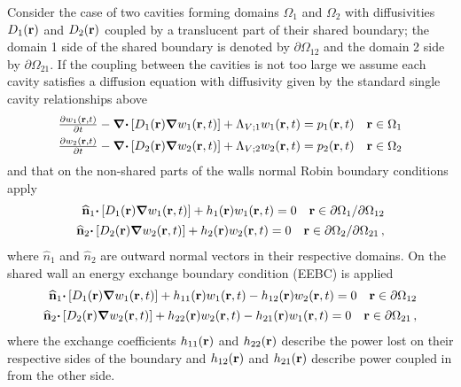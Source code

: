 \documentclass[a4paper]{article}
\numberwithin{equation}{section}
\begin{document}
Consider the case of two cavities forming domains $\Omega_1$ and $\Omega_2$ with
diffusivities $D_1(\boldsymbol{\mathrm{r}})$ and $D_2(\boldsymbol{\mathrm{r}})$ coupled by a translucent part of their 
shared boundary; the domain 1 side of the shared boundary is denoted by 
${\partial}\Omega_{12}$ and the domain 2 side by ${\partial}\Omega_{21}$.
If the coupling between the cavities is not too large we assume each cavity 
satisfies a diffusion equation with diffusivity given by the standard single 
cavity relationships above
\begin{align}
\begin{matrix}
\frac{{\partial}w_1(\boldsymbol{\mathrm{r}},t)}{{\partial}t}-{\boldsymbol{\mathrm{\nabla}}}{\boldsymbol{\mathrm{\cdot}}}\left[D_1(\boldsymbol{\mathrm{r}}){\boldsymbol{\mathrm{\nabla}}}w_1(\boldsymbol{\mathrm{r}},t)\right]+\Lambda_{V;1}w_1(\boldsymbol{\mathrm{r}},t) = p_1(\boldsymbol{\mathrm{r}},t) &\boldsymbol{\mathrm{r}}\in\Omega_1
\end{matrix} \\
\begin{matrix}
\frac{{\partial}w_2(\boldsymbol{\mathrm{r}},t)}{{\partial}t}-{\boldsymbol{\mathrm{\nabla}}}{\boldsymbol{\mathrm{\cdot}}}\left[D_2(\boldsymbol{\mathrm{r}}){\boldsymbol{\mathrm{\nabla}}}w_2(\boldsymbol{\mathrm{r}},t)\right]+\Lambda_{V;2}w_2(\boldsymbol{\mathrm{r}},t) = p_2(\boldsymbol{\mathrm{r}},t) &\boldsymbol{\mathrm{r}}\in\Omega_2
\end{matrix}
\end{align}
and that on the non-shared parts of the walls normal Robin boundary conditions
apply
\begin{align}
\begin{matrix}
\widehat{\boldsymbol{\mathrm{n}}}_1{\boldsymbol{\mathrm{\cdot}}}\left[D_1(\boldsymbol{\mathrm{r}}){\boldsymbol{\mathrm{\nabla}}}w_1(\boldsymbol{\mathrm{r}},t)\right]+h_1(\boldsymbol{\mathrm{r}}) w_1(\boldsymbol{\mathrm{r}},t) = 0 &\boldsymbol{\mathrm{r}}\in\partial\Omega_1/\partial\Omega_{12}
\end{matrix}\\
\begin{matrix}
\widehat{\boldsymbol{\mathrm{n}}}_2{\boldsymbol{\mathrm{\cdot}}}\left[D_2(\boldsymbol{\mathrm{r}}){\boldsymbol{\mathrm{\nabla}}}w_2(\boldsymbol{\mathrm{r}},t)\right]+h_2(\boldsymbol{\mathrm{r}}) w_2(\boldsymbol{\mathrm{r}},t) = 0 &\boldsymbol{\mathrm{r}}\in\partial\Omega_2/\partial\Omega_{21}\,,
\end{matrix}
\end{align}
where  $\widehat  n_1$ and  $\widehat  n_2$ are outward normal vectors in their
respective domains. On the shared wall an energy exchange boundary condition (EEBC) is
applied~\citep{Billon2008}
\begin{align}
\label{eq:eebc1}
\begin{matrix}
\uvn_1{\vcdot}\left[D_1\pr{\vnabla}w_1\prt\right]+h_{11}\pr w_1\prt-h_{12}\pr w_2\prt = 0 &\vr\in\partial\Omega_{12}
\end{matrix}\\
\label{eq:eebc2}
\begin{matrix}
\uvn_2{\vcdot}\left[D_2\pr{\vnabla}w_2\prt\right]+h_{22}\pr w_2\prt-h_{21}\pr w_1\prt = 0 &\vr\in\partial\Omega_{21}
\end{matrix}\,,
\end{align}
where the exchange coefficients $h_{11}(\boldsymbol{\mathrm{r}})$ and $h_{22}(\boldsymbol{\mathrm{r}})$ describe the power lost 
on their respective sides of the boundary and $h_{12}(\boldsymbol{\mathrm{r}})$ and $h_{21}(\boldsymbol{\mathrm{r}})$ describe power
coupled in from the other side.
\end{document}
